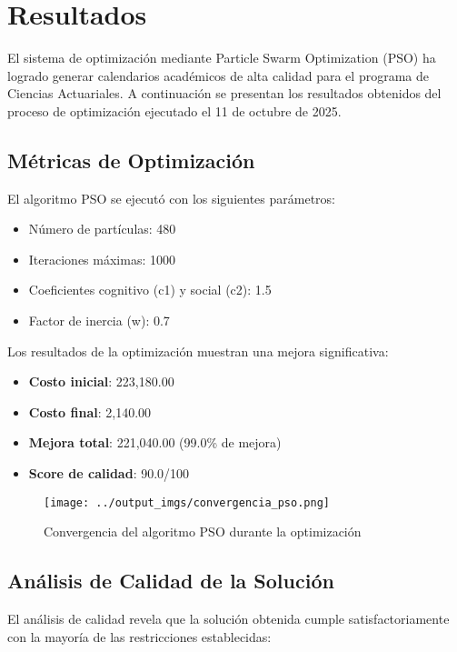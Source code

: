 \section{Resultados}

El sistema de optimización mediante Particle Swarm Optimization (PSO) ha logrado generar calendarios académicos de alta calidad para el programa de Ciencias Actuariales. A continuación se presentan los resultados obtenidos del proceso de optimización ejecutado el 11 de octubre de 2025.

\subsection{Métricas de Optimización}

El algoritmo PSO se ejecutó con los siguientes parámetros:
\begin{itemize}
    \item Número de partículas: 480
    \item Iteraciones máximas: 1000
    \item Coeficientes cognitivo (c1) y social (c2): 1.5
    \item Factor de inercia (w): 0.7
\end{itemize}

Los resultados de la optimización muestran una mejora significativa:
\begin{itemize}
    \item \textbf{Costo inicial}: 223,180.00
    \item \textbf{Costo final}: 2,140.00
    \item \textbf{Mejora total}: 221,040.00 (99.0\% de mejora)
    \item \textbf{Score de calidad}: 90.0/100
\end{itemize}

\begin{figure}[htbp]
    \centering
    \texttt{[image: ../output\_imgs/convergencia\_pso.png]}
    \caption{Convergencia del algoritmo PSO durante la optimización}
    \label{fig:convergencia_pso}
\end{figure}

\subsection{Análisis de Calidad de la Solución}

El análisis de calidad revela que la solución obtenida cumple satisfactoriamente con la mayoría de las restricciones establecidas:

